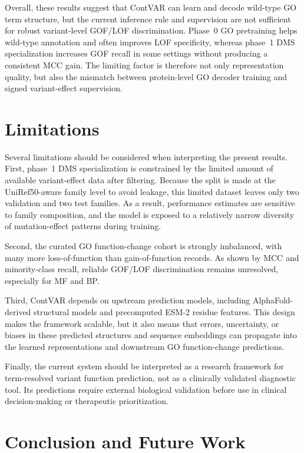 \documentclass[11pt,a4paper]{article}
\begin{document}
Overall, these results suggest that ContVAR can learn and decode wild-type GO term structure, but the current inference rule and supervision are not sufficient for robust variant-level GOF/LOF discrimination. Phase~0 GO pretraining helps wild-type annotation and often improves LOF specificity, whereas phase~1 DMS specialization increases GOF recall in some settings without producing a consistent MCC gain. The limiting factor is therefore not only representation quality, but also the mismatch between protein-level GO decoder training and signed variant-effect supervision.


\section{Limitations}

Several limitations should be considered when interpreting the present results. First, phase~1 DMS specialization is constrained by the limited amount of available variant-effect data after filtering. Because the split is made at the UniRef50-aware family level to avoid leakage, this limited dataset leaves only two validation and two test families. As a result, performance estimates are sensitive to family composition, and the model is exposed to a relatively narrow diversity of mutation-effect patterns during training.

Second, the curated GO function-change cohort is strongly imbalanced, with many more loss-of-function than gain-of-function records. As shown by MCC and minority-class recall, reliable GOF/LOF discrimination remains unresolved, especially for MF and BP.

Third, ContVAR depends on upstream prediction models, including AlphaFold-derived structural models and precomputed ESM-2 residue features. This design makes the framework scalable, but it also means that errors, uncertainty, or biases in these predicted structures and sequence embeddings can propagate into the learned representations and downstream GO function-change predictions.

Finally, the current system should be interpreted as a research framework for term-resolved variant function prediction, not as a clinically validated diagnostic tool. Its predictions require external biological validation before use in clinical decision-making or therapeutic prioritization.


\section{Conclusion and Future Work}
\end{document}
